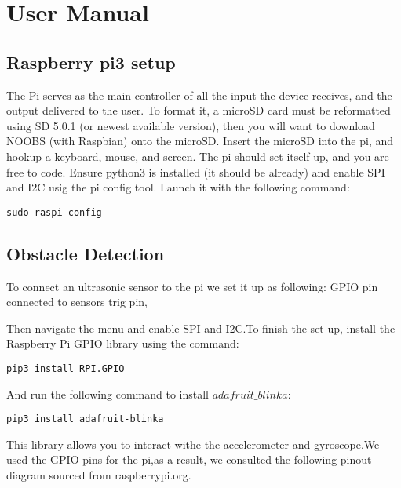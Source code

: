 \documentclass[letterpaper,12pt]{article}
\begin{document}
\newpage

\section{User Manual}
\subsection{Raspberry pi3 setup}
The Pi serves as the main controller of all the input the device receives, and the output delivered to the user. To format it, a microSD card must be reformatted using SD 5.0.1 (or newest available version), then you will want to download NOOBS (with Raspbian) onto the microSD. Insert the microSD into the pi, and hookup a keyboard, mouse, and screen. The pi should set itself up, and you are free to code. Ensure python3 is installed (it should be already) and enable SPI and I2C usig the pi config tool. Launch it with the following command:
\begin{lstlisting}
sudo raspi-config

\end{lstlisting}
\subsection{Obstacle Detection }
To connect an ultrasonic sensor to the pi we set it up as following: GPIO pin connected to sensors trig pin, 


Then navigate the menu and enable SPI and I2C.To finish the set up, install the Raspberry Pi GPIO library using the command:
\begin{lstlisting}
pip3 install RPI.GPIO
\end{lstlisting}
And run the following command to install $adafruit\_blinka$:
\begin{lstlisting}
pip3 install adafruit-blinka
\end{lstlisting}

This library allows you to interact withe the accelerometer and gyroscope.We used the GPIO pins for the pi,as a result, we consulted the following pinout diagram sourced from raspberrypi.org.

\end{document}
